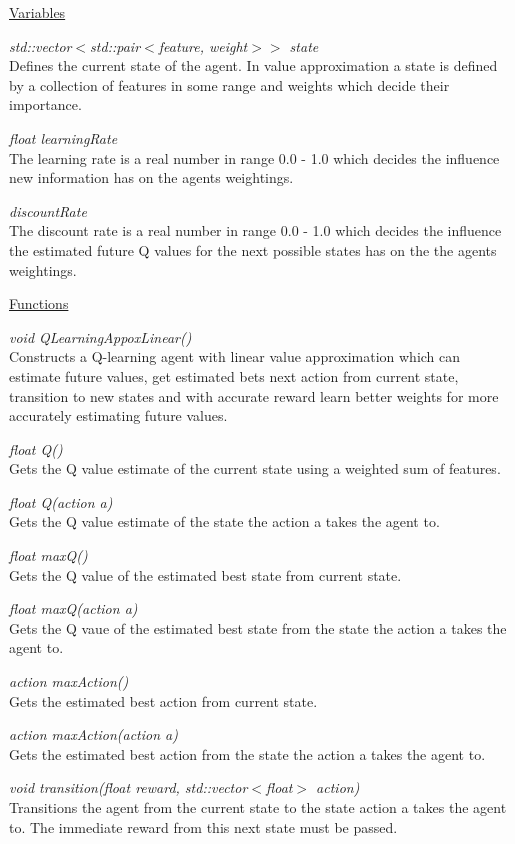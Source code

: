 \documentclass{report}
\begin{document}
\noindent\underline{Variables}

\textit{std::vector$<$std::pair$<$feature, weight$>>$ state}\\
Defines the current state of the agent. In value approximation a state is defined by a collection of features in some range and weights which decide their importance.

\textit{float learningRate}\\
The learning rate is a real number in range 0.0 - 1.0 which decides the influence new information has on the agents weightings.

\textit{discountRate}\\
The discount rate is a real number in range 0.0 - 1.0 which decides the influence the estimated future Q values for the next possible states has on the the agents weightings.

\noindent\underline{Functions}

\textit{void QLearningAppoxLinear()}\\
Constructs a Q-learning agent with linear value approximation which can estimate future values, get estimated bets next action from current state,
transition to new states and with accurate reward learn better weights for more accurately estimating future values.

\textit{float Q()}\\
Gets the Q value estimate of the current state using a weighted sum of features.

\textit{float Q(action a)}\\
Gets the Q value estimate of the state the action a takes the agent to.

\textit{float maxQ()}\\
Gets the Q value of the estimated best state from current state. 

\textit{float maxQ(action a)}\\
Gets the Q vaue of the estimated best state from the state the action a takes the agent to.

\textit{action maxAction()}\\
Gets the estimated best action from current state.

\textit{action maxAction(action a)}\\
Gets the estimated best action from the state the action a takes the agent to.

\textit{void transition(float reward, std::vector$<$float$>$ action)}\\
Transitions the agent from the current state to the state action a takes the agent to. The immediate reward from this next state must be passed.
\end{document}
